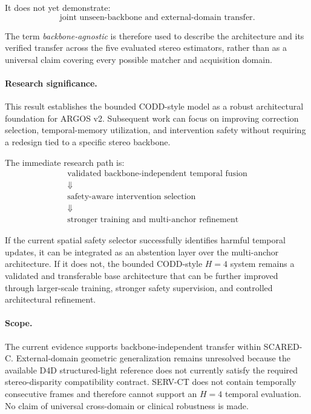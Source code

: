 \documentclass[11pt,a4paper]{article}
\begin{document}
It does not yet demonstrate:
\begin{equation}
    \boxed{
    \text{joint unseen-backbone and external-domain transfer}
    }.
\end{equation}

The term \emph{backbone-agnostic} is therefore used to describe the architecture
and its verified transfer across the five evaluated stereo estimators, rather
than as a universal claim covering every possible matcher and acquisition
domain.

\paragraph{Research significance.}

This result establishes the bounded CODD-style model as a robust architectural
foundation for ARGOS v2. Subsequent work can focus on improving correction
selection, temporal-memory utilization, and intervention safety without
requiring a redesign tied to a specific stereo backbone.

The immediate research path is:
\begin{equation}
    \boxed{
    \begin{array}{c}
    \text{validated backbone-independent temporal fusion}\\
    \Downarrow\\
    \text{safety-aware intervention selection}\\
    \Downarrow\\
    \text{stronger training and multi-anchor refinement}
    \end{array}}
\end{equation}

If the current spatial safety selector successfully identifies harmful temporal
updates, it can be integrated as an abstention layer over the multi-anchor
architecture. If it does not, the bounded CODD-style \(H=4\) system remains a
validated and transferable base architecture that can be further improved
through larger-scale training, stronger safety supervision, and controlled
architectural refinement.

\paragraph{Scope.}

The current evidence supports backbone-independent transfer within SCARED-C.
External-domain geometric generalization remains unresolved because the
available D4D structured-light reference does not currently satisfy the required
stereo-disparity compatibility contract. SERV-CT does not contain temporally
consecutive frames and therefore cannot support an \(H=4\) temporal evaluation.
No claim of universal cross-domain or clinical robustness is made.
\end{document}
